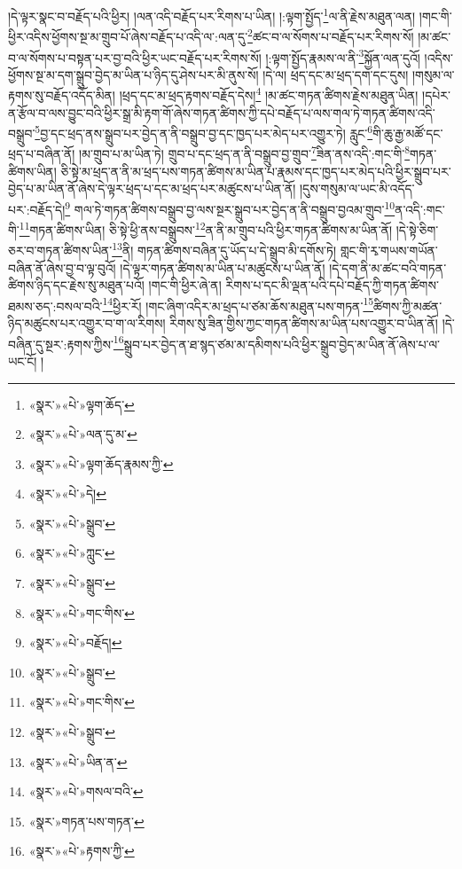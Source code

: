 །དེ་ལྟར་སྣང་བ་བརྗོད་པའི་ཕྱིར། །ལན་འདི་བརྗོད་པར་རིགས་པ་ཡིན། །:ལྟག་སྤྱོད་\footnote{«སྣར་»«པེ་»ལྟག་ཆོད་}ལ་ནི་རྗེས་མཐུན་ལན། །གང་གི་ཕྱིར་འདིས་ཕྱོགས་སྔ་མ་གྲུབ་པོ་ཞེས་བརྗོད་པ་འདི་ལ་:ལན་དུ་\footnote{«སྣར་»«པེ་»ལན་དུ་མ་}ཚང་བ་ལ་སོགས་པ་བརྗོད་པར་རིགས་སོ། །མ་ཚང་བ་ལ་སོགས་པ་བསྟན་པར་བྱ་བའི་ཕྱིར་ཡང་བརྗོད་པར་རིགས་སོ། །:ལྟག་སྤྱོད་རྣམས་ལ་ནི་\footnote{«སྣར་»«པེ་»ལྟག་ཆོད་རྣམས་ཀྱི་}སྐྱོན་ལན་དུའོ། །འདིས་ཕྱོགས་སྔ་མ་དག་སྒྲུབ་བྱེད་མ་ཡིན་པ་ཉིད་དུ་ཤེས་པར་མི་ནུས་སོ། །དེ་ལ། ཕྲད་དང་མ་ཕྲད་དག་དང་དུས། །གསུམ་ལ་རྟགས་སུ་བརྗོད་འདོད་མིན། །ཕྲད་དང་མ་ཕྲད་རྟགས་བརྗོད་དེས།\footnote{«སྣར་»«པེ་»དེ།} །མ་ཚང་གཏན་ཚིགས་རྗེས་མཐུན་ཡིན། །དཔེར་ན་རྩོལ་བ་ལས་བྱུང་བའི་ཕྱིར་སྒྲ་མི་རྟག་གོ་ཞེས་གཏན་ཚིགས་ཀྱི་དཔེ་བརྗོད་པ་ལས་གལ་ཏེ་གཏན་ཚིགས་འདི་བསྒྲུབ་\footnote{«སྣར་»«པེ་»སྒྲུབ་}བྱ་དང་ཕྲད་ནས་སྒྲུབ་པར་བྱེད་ན་ནི་བསྒྲུབ་བྱ་དང་ཁྱད་པར་མེད་པར་འགྱུར་ཏེ། རླུང་\footnote{«སྣར་»«པེ་»ཀླུང་}གི་ཆུ་རྒྱ་མཚོ་དང་ཕྲད་པ་བཞིན་ནོ། །མ་གྲུབ་པ་མ་ཡིན་ཏེ། གྲུབ་པ་དང་ཕྲད་ན་ནི་བསྒྲུབ་བྱ་གྲུབ་\footnote{«སྣར་»«པེ་»སྒྲུབ་}ཟིན་ནས་འདི་:གང་གི་\footnote{«སྣར་»«པེ་»གང་གིས་}གཏན་ཚིགས་ཡིན། ཅི་སྟེ་མ་ཕྲད་ན་ནི་མ་ཕྲད་པས་གཏན་ཚིགས་མ་ཡིན་པ་རྣམས་དང་ཁྱད་པར་མེད་པའི་ཕྱིར་སྒྲུབ་པར་བྱེད་པ་མ་ཡིན་ནོ་ཞེས་དེ་ལྟར་ཕྲད་པ་དང་མ་ཕྲད་པར་མཚུངས་པ་ཡིན་ནོ། །དུས་གསུམ་ལ་ཡང་མི་འདོད་པར་:བརྗོད་དེ།\footnote{«སྣར་»«པེ་»བརྗོད།} གལ་ཏེ་གཏན་ཚིགས་བསྒྲུབ་བྱ་ལས་སྔར་སྒྲུབ་པར་བྱེད་ན་ནི་བསྒྲུབ་བྱའམ་གྲུབ་\footnote{«སྣར་»«པེ་»སྒྲུབ་}ན་འདི་:གང་གི་\footnote{«སྣར་»«པེ་»གང་གིས་}གཏན་ཚིགས་ཡིན། ཅི་སྟེ་ཕྱི་ནས་བསྒྲུབས་\footnote{«སྣར་»«པེ་»སྒྲུབ་}ན་ནི་མ་གྲུབ་པའི་ཕྱིར་གཏན་ཚིགས་མ་ཡིན་ནོ། །དེ་སྟེ་ཅིག་ཅར་བ་གཏན་ཚིགས་ཡིན་\footnote{«སྣར་»«པེ་»ཡིན་ན་}ནི། གཏན་ཚིགས་བཞིན་དུ་ཡོད་པ་དེ་སྒྲུབ་མི་དགོས་ཏེ། གླང་གི་རྭ་གཡས་གཡོན་བཞིན་ནོ་ཞེས་བྱ་བ་ལྟ་བུའོ། །དེ་ལྟར་གཏན་ཚིགས་མ་ཡིན་པ་མཚུངས་པ་ཡིན་ནོ། །དེ་དག་ནི་མ་ཚང་བའི་གཏན་ཚིགས་ཉིད་དང་རྗེས་སུ་མཐུན་པའོ། །གང་གི་ཕྱིར་ཞེ་ན། རིགས་པ་དང་མི་ལྡན་པའི་དཔེ་བརྗོད་ཀྱི་གཏན་ཚིགས་ཐམས་ཅད་:བསལ་བའི་\footnote{«སྣར་»«པེ་»གསལ་བའི་}ཕྱིར་རོ། །གང་ཞིག་འདིར་མ་ཕྲད་པ་ཙམ་ཆོས་མཐུན་པས་གཏན་\footnote{«སྣར་»གཏན་པས་གཏན་}ཚིགས་ཀྱི་མཚན་ཉིད་མཚུངས་པར་འགྱུར་བ་ག་ལ་རིགས། རིགས་སུ་ཟིན་གྱིས་ཀྱང་གཏན་ཚིགས་མ་ཡིན་པས་འགྱུར་བ་ཡིན་ནོ། །དེ་བཞིན་དུ་སྔར་:རྟགས་ཀྱིས་\footnote{«སྣར་»«པེ་»རྟགས་ཀྱི་}སྒྲུབ་པར་བྱེད་ན་ཐ་སྙད་ཙམ་མ་དམིགས་པའི་ཕྱིར་སྒྲུབ་བྱེད་མ་ཡིན་ནོ་ཞེས་པ་ལ་ཡང་ངོ། །
